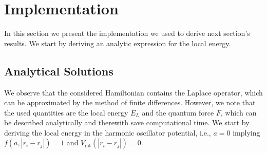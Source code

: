 \documentclass[11pt,a4paper]{article}
\numberwithin{equation}{section}
\begin{document}
\section{Implementation}
%
%
%
In this section we present the implementation we used to derive next section's results. 
%
We start by deriving an analytic expression for the local energy. 
\subsection{Analytical Solutions}
%
%
We observe that the considered Hamiltonian contains the Laplace operator, which can be approximated by the method of finite differences.
%
However, we note that the used quantities are the local energy $E_L$ and the quantum force $F$, which can be described analytically and therewith save computational time. 
%
We start by deriving the local energy in the harmonic oscillator potential, i.e., $a=0$ implying $f(a,|r_i-r_j|)=1$ and $V_{\mathrm{int}}(|r_i-r_j|)=0$.
%
\end{document}
